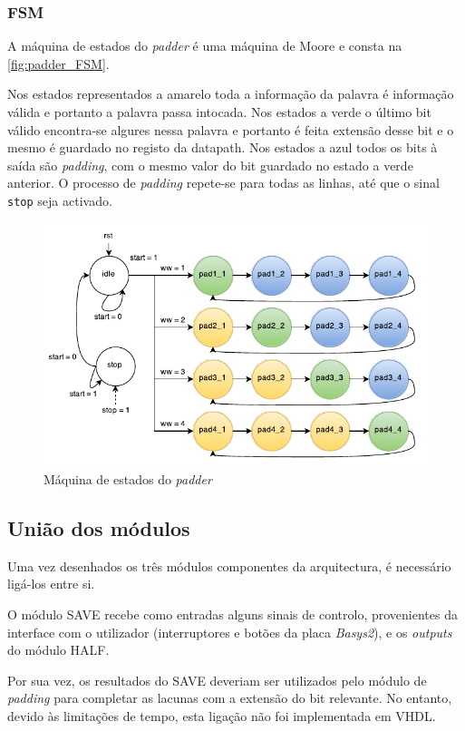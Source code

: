 \documentclass[a4paper]{article}
\begin{document}
\subsubsection{FSM}
A máquina de estados do \textit{padder} é uma máquina de Moore e consta na \autoref{fig:padder_FSM}.

Nos estados representados a amarelo toda a informação da palavra é informação válida e portanto a palavra passa intocada. Nos estados a verde o último bit válido encontra-se algures nessa palavra e portanto é feita extensão desse bit e o mesmo é guardado no registo da datapath. Nos estados a azul todos os bits à saída são \textit{padding}, com o mesmo valor do bit guardado no estado a verde anterior. O processo de \textit{padding} repete-se para todas as linhas, até que o sinal \texttt{stop} seja activado.

\begin{figure}[h]
	\centering
	\includegraphics[width=.9\linewidth]{padder_FSM}
	\caption{Máquina de estados do \textit{padder}}
	\label{fig:padder_FSM}
\end{figure}

\subsection{União dos módulos}

Uma vez desenhados os três módulos componentes da arquitectura, é necessário ligá-los entre si.

O módulo SAVE recebe como entradas alguns sinais de controlo, provenientes da interface com o utilizador (interruptores e botões da placa \textit{Basys2}), e os \textit{outputs} do módulo HALF.

Por sua vez, os resultados do SAVE deveriam ser utilizados pelo módulo de \textit{padding} para completar as lacunas com a extensão do bit relevante. No entanto, devido às limitações de tempo, esta ligação não foi implementada em VHDL.
\end{document}
